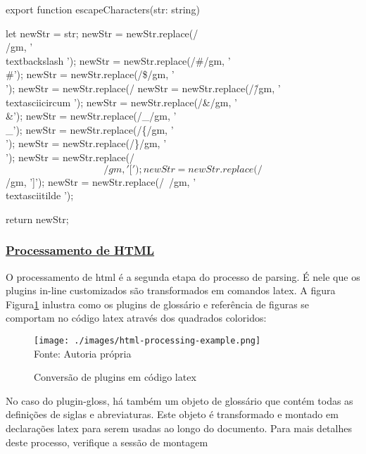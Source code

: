 \begin{codeEscape}
export function escapeCharacters(str: string){
    let newStr = str;
    newStr = newStr.replace(/\\/gm, '\\textbackslash ');
    newStr = newStr.replace(/#/gm, '\\#');
    newStr = newStr.replace(/\$/gm, '\\$$');
    newStr = newStr.replace(/%
    newStr = newStr.replace(/\^/gm, '\\textasciicircum ');
    newStr = newStr.replace(/&/gm, '\\&');
    newStr = newStr.replace(/_/gm, '\\_');
    newStr = newStr.replace(/\{/gm, '\\{');
    newStr = newStr.replace(/\}/gm, '\\}');
    newStr = newStr.replace(/\[/gm, '{[}');
    newStr = newStr.replace(/\]/gm, '{]}');
    newStr = newStr.replace(/~/gm, '\\textasciitilde ');

    return newStr;
}
\end{codeEscape}

\subsubsection{\underline{Processamento de HTML}}

O processamento de
\acrshort{html}
é a segunda etapa do processo de parsing. É
nele que os plugins in-line customizados são transformados
em comandos
\acrshort{latex}.
A figura
Figura\ref{fig:html-processing-example}
inlustra como os plugins de glossário e referência de figuras
se comportam no código
\acrshort{latex}
através dos quadrados coloridos:

\begin{figure}[H]
    \centering
    \caption{Conversão de plugins em código latex}
    \texttt{[image: ./images/html-processing-example.png]}
    \label{fig:html-processing-example} \\
    \textnormal{\fontsize{10pt}{12pt}Fonte: Autoria própria}
\end{figure}

No caso do plugin-gloss, há também um objeto de glossário que contém todas as definições
de siglas e abreviaturas. Este objeto é transformado e montado em declarações
\acrshort{latex}
para serem usadas ao longo do documento.
Para mais detalhes deste processo, verifique a sessão de montagem

